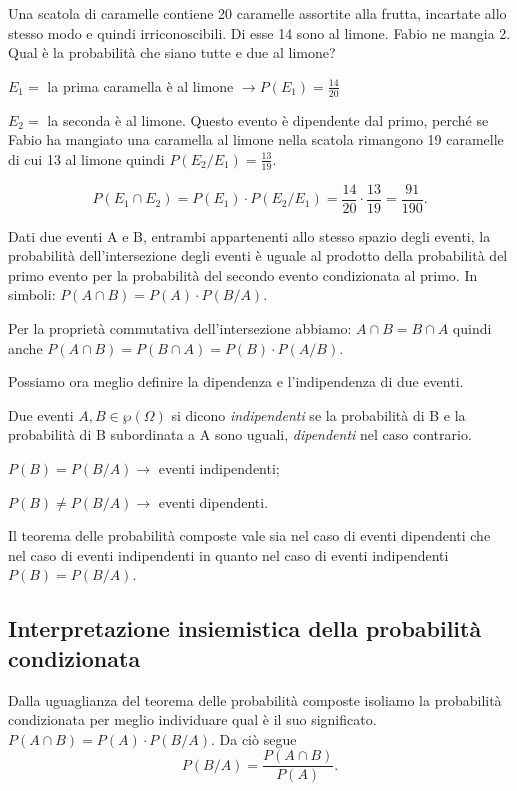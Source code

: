 \begin{esempio}
Una scatola di caramelle contiene 20 caramelle assortite alla frutta, incartate 
allo stesso modo e quindi irriconoscibili. Di esse 14 sono al limone. Fabio ne 
mangia 2. Qual è la probabilità che siano tutte e due al limone?
\begin{itemize*}
\item $E_1=$ la prima caramella è al limone $\to P(E_1)=\frac{14}{20}$
\item $E_2=$ la seconda è al limone. Questo evento è dipendente dal primo, 
perché se Fabio ha mangiato una caramella al limone nella scatola rimangono 19 
caramelle di cui 13 al limone quindi $P(E_2/E_1)=\frac{13}{19}$.
\end{itemize*}
\[P(E_1\cap E_2)=P(E_1)\cdot P(E_2/E_1)=\frac{14}{20}\cdot 
\frac{13}{19}=\frac{91}{190}.\]
\end{esempio}

\begin{teorema}
Dati due eventi A e B, entrambi appartenenti allo stesso spazio degli eventi, 
la 
probabilità dell'intersezione degli eventi è uguale al prodotto della 
probabilità del primo evento per la probabilità del secondo evento condizionata 
al primo. In simboli: $P(A\cap B)=P(A)\cdot P(B/A)$.
\end{teorema}

Per la proprietà commutativa dell'intersezione abbiamo: $A\cap B=B\cap A$ 
quindi 
anche $P(A\cap B)=P(B\cap A)=P(B)\cdot P(A/B)$.

Possiamo ora meglio definire la dipendenza e l'indipendenza di due eventi.

\begin{definizione}
Due eventi $A,B\in \wp (\Omega )$ si dicono \emph{indipendenti} se la 
probabilità di B e la probabilità di B subordinata a A sono uguali, 
\emph{dipendenti} nel caso contrario.

$P(B)=P(B/A)\to$ eventi indipendenti;

 ${P}(B)\neq P(B/A)\to$ eventi dipendenti.
\end{definizione}

\osservazione Il teorema delle probabilità composte vale sia nel caso di eventi 
dipendenti che nel caso di eventi indipendenti in quanto nel caso di eventi 
indipendenti $P(B)=P(B/A)$.

\subsection{Interpretazione insiemistica della probabilità condizionata}
Dalla uguaglianza del teorema delle probabilità composte isoliamo la 
probabilità 
condizionata per meglio individuare qual è il suo significato. $P(A\cap 
B)=P(A)\cdot P(B/A)$. Da ciò segue 
\[P(B/A)=\frac{P(A\cap B)}{P(A)}.\]

